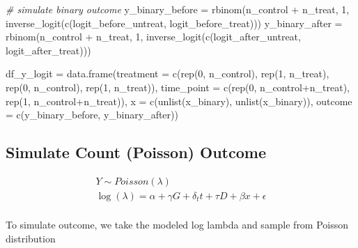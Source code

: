 \documentclass[
]{article}
\newenvironment{Shaded}{\begin{snugshade}}{\end{snugshade}}
\newcommand{\AttributeTok}[1]{\textcolor[rgb]{0.77,0.63,0.00}{#1}}
\newcommand{\CommentTok}[1]{\textcolor[rgb]{0.56,0.35,0.01}{\textit{#1}}}
\newcommand{\DecValTok}[1]{\textcolor[rgb]{0.00,0.00,0.81}{#1}}
\newcommand{\FunctionTok}[1]{\textcolor[rgb]{0.00,0.00,0.00}{#1}}
\newcommand{\NormalTok}[1]{#1}
\newcommand{\OtherTok}[1]{\textcolor[rgb]{0.56,0.35,0.01}{#1}}
\newcommand{\SpecialCharTok}[1]{\textcolor[rgb]{0.00,0.00,0.00}{#1}}
\begin{document}
\begin{Shaded}
\begin{Highlighting}[]
\CommentTok{\# simulate binary outcome}
\NormalTok{y\_binary\_before }\OtherTok{=} \FunctionTok{rbinom}\NormalTok{(n\_control }\SpecialCharTok{+}\NormalTok{ n\_treat, }\DecValTok{1}\NormalTok{, }\FunctionTok{inverse\_logit}\NormalTok{(}\FunctionTok{c}\NormalTok{(logit\_before\_untreat, logit\_before\_treat)))}
\NormalTok{y\_binary\_after }\OtherTok{=} \FunctionTok{rbinom}\NormalTok{(n\_control }\SpecialCharTok{+}\NormalTok{ n\_treat, }\DecValTok{1}\NormalTok{, }\FunctionTok{inverse\_logit}\NormalTok{(}\FunctionTok{c}\NormalTok{(logit\_after\_untreat, logit\_after\_treat)))}

\NormalTok{df\_y\_logit }\OtherTok{=} \FunctionTok{data.frame}\NormalTok{(}\AttributeTok{treatment =} \FunctionTok{c}\NormalTok{(}\FunctionTok{rep}\NormalTok{(}\DecValTok{0}\NormalTok{, n\_control), }\FunctionTok{rep}\NormalTok{(}\DecValTok{1}\NormalTok{, n\_treat), }\FunctionTok{rep}\NormalTok{(}\DecValTok{0}\NormalTok{, n\_control), }\FunctionTok{rep}\NormalTok{(}\DecValTok{1}\NormalTok{, n\_treat)),}
                        \AttributeTok{time\_point =} \FunctionTok{c}\NormalTok{(}\FunctionTok{rep}\NormalTok{(}\DecValTok{0}\NormalTok{, n\_control}\SpecialCharTok{+}\NormalTok{n\_treat), }\FunctionTok{rep}\NormalTok{(}\DecValTok{1}\NormalTok{, n\_control}\SpecialCharTok{+}\NormalTok{n\_treat)),}
                        \AttributeTok{x =} \FunctionTok{c}\NormalTok{(}\FunctionTok{unlist}\NormalTok{(x\_binary), }\FunctionTok{unlist}\NormalTok{(x\_binary)),}
                        \AttributeTok{outcome =} \FunctionTok{c}\NormalTok{(y\_binary\_before, y\_binary\_after))}
\end{Highlighting}
\end{Shaded}

\hypertarget{simulate-count-poisson-outcome}{%
\subsection{Simulate Count (Poisson)
Outcome}\label{simulate-count-poisson-outcome}}

\[
\begin{gather*}
Y \sim Poisson (\lambda) \\
\log(\lambda) = \alpha + \gamma G + \delta_t t + \tau D + \beta x + \epsilon \\
\end{gather*}
\]

To simulate outcome, we take the modeled log lambda and sample from
Poisson distribution
\end{document}

